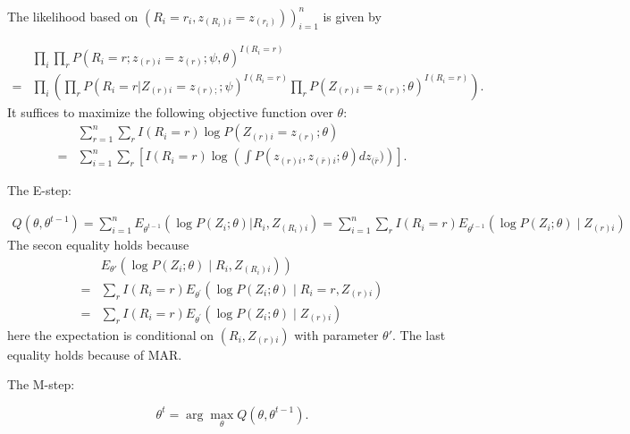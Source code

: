 \documentclass[
  14pt,
]{article}
\begin{document}
The likelihood based on
\(\left.\left(R_i=r_i, z_{\left(R_i\right)i}=z_{\left(r_i\right)}\right)\right)_{i=1}^n\)
is given by

\begin{align*}
& \prod_i \prod_r P\left(R_i=r ; z_{(r) i}=z_{(r)} ; \psi, \theta\right)^{I\left(R_i=r\right)} \\
= & \prod_i\left(\prod_r P\left(R_i=r|Z_{(r) i}=z_{(r) ;} ; \psi \right)^{I\left(R_i=r\right)} \prod_r P\left(Z_{(r) i}=z_{(r)} ; \theta\right)^{I\left(R_i=r\right)}\right).
\end{align*} It suffices to maximize the following objective function
over \(\theta\): \begin{align*}
&\sum_{r=1}^n \sum_r I\left(R_i=r\right) \log P\left(Z_{(r)i}=z_{(r)}; \theta\right) \\
=&\sum_{i=1}^n \sum_r \left[I\left(R_i=r\right) \log \left( \int P\left(z_{(r)i}, z_{(\bar{r})i}; \theta\right) d{z_{(\bar{r}})}\right)\right].
\end{align*}

The E-step:

\begin{align*}
Q\left(\theta, \theta^{t-1}\right)=\sum_{i=1}^n E_{\theta^{t-1}}(\log P(Z_i;\theta)|R_i, Z_{(R_i)i})= \sum_{i=1}^n \sum_{r}I\left(R_i=r\right) E_{\theta^{t-1}}\left(\log P\left(Z_i; \theta\right) \mid Z_{(r) i}\right)
\end{align*} The secon equality holds because \begin{align*}
& \left.E_{\theta'}\left(\log P\left(Z_i; \theta\right) \mid R_i, Z_{(R_i)i}\right)\right) \\
= & \sum_{r}I\left(R_i=r\right) E_{\theta^{\prime}}\left(\log P\left(Z_i; \theta\right) \mid R_i=r, Z_{(r)i}\right) \\
= &  \sum_{r}I\left(R_i=r\right) E_{\theta^{\prime}}\left(\log P\left(Z_i; \theta\right) \mid Z_{(r) i}\right)
\end{align*} here the expectation is conditional on \((R_i, Z_{(r)i})\)
with parameter \(\theta'\). The last equality holds because of MAR.

The M-step:

\[\theta^t =\arg \max_{\theta} Q(\theta, \theta^{t-1}).\]
\end{document}
